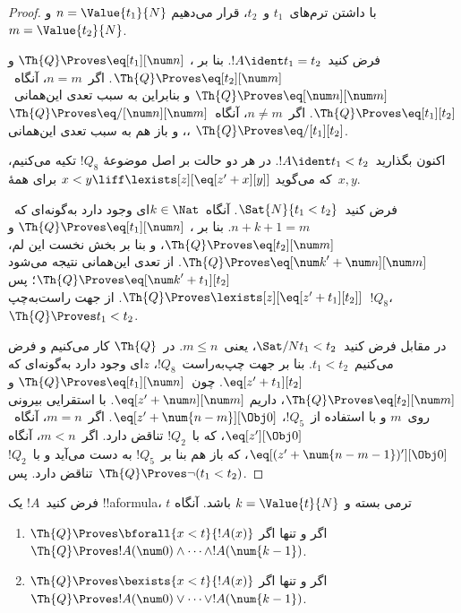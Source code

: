\documentclass[../../../include/open-logic-section]{subfiles}
\begin{document}
\begin{proof}
با داشتن ترم‌های~$t_1$ و~$t_2$، قرار می‌دهیم
$n = \Value{t_1}{N}$ و~$m = \Value{t_2}{N}$.

فرض کنید~$!A \ident t_1 = t_2$. بنا بر
،
$\Th{Q} \Proves \eq[t_1][\num n]$ و
$\Th{Q} \Proves \eq[t_2][\num m]$.
اگر~$n = m$، آنگاه~$\Th{Q} \Proves \eq[\num n][\num m]$ و بنابراین
به سبب تعدی این‌همانی~$\Th{Q} \Proves \eq[t_1][t_2]$.
اگر~$n \neq m$، آنگاه~$\Th{Q} \Proves \eq/[\num n][\num m]$، و
باز هم به سبب تعدی این‌همانی،
$\Th{Q} \Proves \eq/[t_1][t_2]$.

اکنون بگذارید~$!A \ident t_1 < t_2$. در هر دو حالت بر اصل موضوعهٔ
$!Q_8$ تکیه می‌کنیم، که می‌گوید
$x < y \liff \lexists[z][\eq[z' + x][y]]$ برای همهٔ~$x,y$.

فرض کنید~$\Sat{N}{t_1 < t_2}$. آنگاه~$k \in \Nat$ای وجود دارد
به‌گونه‌ای که~$n + k + 1 = m$. بنا بر
،
$\Th{Q} \Proves \eq[t_1][\num n]$ و
$\Th{Q} \Proves \eq[t_2][\num m]$، و بنا بر بخش نخست این لم،
$\Th{Q} \Proves \eq[{\num k}' + \num n][\num m]$.
از تعدی این‌همانی نتیجه می‌شود
$\Th{Q} \Proves \eq[{\num k}' + t_1][t_2]$؛ پس
$\Th{Q} \Proves \lexists[z][\eq[z' + t_1][t_2]]$.
از جهت راست‌به‌چپ~$!Q_8$، $\Th{Q} \Proves t_1 < t_2$.

در مقابل فرض کنید~$\Sat/{N}{t_1 < t_2}$، یعنی~$m \leq n$.
%
در~$\Th{Q}$ کار می‌کنیم و فرض می‌کنیم~$t_1 < t_2$. بنا بر جهت
چپ‌به‌راست~$!Q_8$، $z$ای وجود دارد به‌گونه‌ای که
$\eq[z' + t_1][t_2]$. چون~$\Th{Q} \Proves \eq[t_1][\num n]$ و
$\Th{Q} \Proves \eq[t_2][\num m]$، داریم
$\eq[z' + \num n][\num m]$.
%
با استقرایی بیرونی روی~$m$ و با استفاده از~$!Q_5$،
$\eq[z' + \num{n - m}][\Obj 0]$.
اگر~$m = n$، آنگاه~$\eq[z'][\Obj 0]$، که با~$!Q_2$ تناقض دارد.
اگر~$m < n$، آنگاه
$\eq[(z' + \num{n - m - 1})'][\Obj 0]$، که باز هم بنا بر~$!Q_5$
به دست می‌آید و با~$!Q_2$ تناقض دارد.
پس~$\Th{Q} \Proves \lnot(t_1 < t_2)$.
\end{proof}

\begin{lem}
فرض کنید~$!A$ یک !!a{formula}، $t$ ترمی بسته و
$k=\Value{t}{N}$ باشد. آنگاه
\begin{enumerate}
\item $\Th{Q} \Proves \bforall{x<t}{!A(x)}$ اگر و تنها اگر
$\Th{Q} \Proves !A(\num 0) \land \dots \land !A(\num{k-1})$.
\item $\Th{Q} \Proves \bexists{x<t}{!A(x)}$ اگر و تنها اگر
$\Th{Q} \Proves !A(\num 0) \lor \dots \lor !A(\num{k-1})$.
\end{enumerate}
\end{lem}
\end{document}
